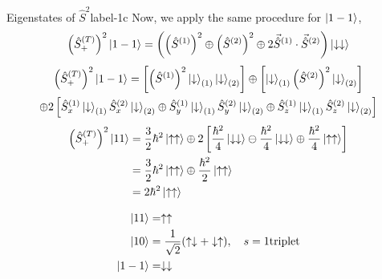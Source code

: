 \documentclass[../main.tex]{subfiles}
\begin{document}
\begin{sol}{Eigenstates of $\hat{S}^{2}$}{label-1c}
    Now, we apply the same procedure for $\ket{1-1}$,
\begin{align*}
        \qty(\hat{S}_{+}^{(T)})^2\ket{1-1} &= \qty(\qty(\hat{S}^{(1)})^2 \oplus \qty(\hat{S}^{(2)})^2 \oplus 2 \vec{\hat{S}}^{(1)}\cdot\vec{\hat{S}}^{(2)})\ket{\downarrow\downarrow} \\
    \end{align*}
    \begin{multline*}
        \qty(\hat{S}_{+}^{(T)})^2\ket{1-1} = \left[
                                        \qty(\hat{S}^{(1)})^{2}\ket{\downarrow}_{(1)}\ket{\downarrow}_{(2)}
                                     \right]
                                     \oplus
                                     \left[
                                        \ket{\downarrow}_{(1)}\qty(\hat{S}^{(2)})^{2}\ket{\downarrow}_{(2)}
                                     \right]
                                     \\
                                    \oplus
                                    2\left[
                                        \hat{S}_{x}^{(1)}\ket{\downarrow}_{(1)}\hat{S}_{x}^{(2)}\ket{\downarrow}_{(2)} 
                                        \oplus
                                        \hat{S}_{y}^{(1)}\ket{\downarrow}_{(1)}\hat{S}_{y}^{(2)}\ket{\downarrow}_{(2)}
                                        \oplus
                                        \hat{S}_{z}^{(1)}\ket{\downarrow}_{(1)}\hat{S}_{z}^{(2)}\ket{\downarrow}_{(2)}
                                    \right]
    \end{multline*}
    \begin{align*}
        \qty(\hat{S}_{+}^{(T)})^2\ket{11} &= \frac{3}{2}\hbar^2\ket{\uparrow\uparrow} \oplus 2\left[\frac{\hbar^2}{4}\ket{\downarrow\downarrow}\ominus\frac{\hbar^2}{4}\ket{\downarrow\downarrow}\oplus\frac{\hbar^2}{4}\ket{\uparrow\uparrow}\right] \\
                                  &= \frac{3}{2}\hbar^2\ket{\uparrow\uparrow} \oplus \frac{\hbar^2}{2}\ket{\uparrow\uparrow} \\
                                  &= 2\hbar^2\ket{\uparrow\uparrow}
    \end{align*}


\end{sol}





\begin{align*}
    \ket{11} &= \uparrow\uparrow \\
    \ket{10} &= \frac{1}{\sqrt{2}}\qty(\uparrow\downarrow+\downarrow\uparrow),\quad s=1\mathrm{triplet} \\
    \ket{1-1} &= \downarrow\downarrow \\
\end{align*}
\end{document}
